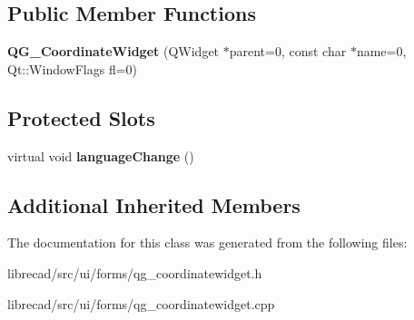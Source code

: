 \subsection*{Public Member Functions}
\begin{DoxyCompactItemize}
\item 
\hypertarget{classQG__CoordinateWidget_aa3390297744373c37829376e22f642a9}{{\bfseries Q\-G\-\_\-\-Coordinate\-Widget} (Q\-Widget $\ast$parent=0, const char $\ast$name=0, Qt\-::\-Window\-Flags fl=0)}\label{classQG__CoordinateWidget_aa3390297744373c37829376e22f642a9}

\end{DoxyCompactItemize}
\subsection*{Protected Slots}
\begin{DoxyCompactItemize}
\item 
\hypertarget{classQG__CoordinateWidget_a4aea47d76783c43ed37fa1938738b135}{virtual void {\bfseries language\-Change} ()}\label{classQG__CoordinateWidget_a4aea47d76783c43ed37fa1938738b135}

\end{DoxyCompactItemize}
\subsection*{Additional Inherited Members}


The documentation for this class was generated from the following files\-:\begin{DoxyCompactItemize}
\item 
librecad/src/ui/forms/qg\-\_\-coordinatewidget.\-h\item 
librecad/src/ui/forms/qg\-\_\-coordinatewidget.\-cpp\end{DoxyCompactItemize}
